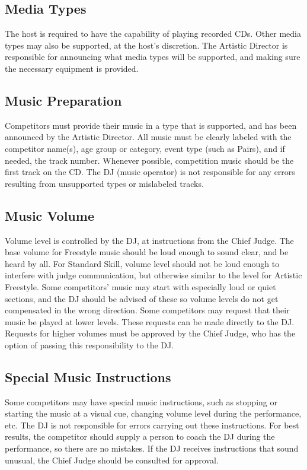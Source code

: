 \subsection{Media Types}
The host is required to have the capability of playing recorded CDs.
Other media types may also be supported, at the host's discretion.
The Artistic Director is responsible for announcing what media types will be supported, and making sure the necessary equipment is provided.

\subsection{Music Preparation}
Competitors must provide their music in a type that is supported, and has been announced by the Artistic Director.
All music must be clearly labeled with the competitor name(s), age group or category, event type (such as Pairs), and if needed, the track number.
Whenever possible, competition music should be the first track on the CD.
The DJ (music operator) is not responsible for any errors resulting from unsupported types or mislabeled tracks.

\subsection{Music Volume}
Volume level is controlled by the DJ, at instructions from the Chief Judge.
The base volume for Freestyle music should be loud enough to sound clear, and be heard by all.
For Standard Skill, volume level should not be loud enough to interfere with judge communication, but otherwise similar to the level for Artistic Freestyle.
Some competitors' music may start with especially loud or quiet sections, and the DJ should be advised of these so volume levels do not get compensated in the wrong direction.
Some competitors may request that their music be played at lower levels.
These requests can be made directly to the DJ.
Requests for higher volumes must be approved by the Chief Judge, who has the option of passing this responsibility to the DJ.

\subsection{Special Music Instructions}
Some competitors may have special music instructions, such as stopping or starting the music at a visual cue, changing volume level during the performance, etc.
The DJ is not responsible for errors carrying out these instructions.
For best results, the competitor should supply a person to coach the DJ during the performance, so there are no mistakes.
If the DJ receives instructions that sound unusual, the Chief Judge should be consulted for approval.

